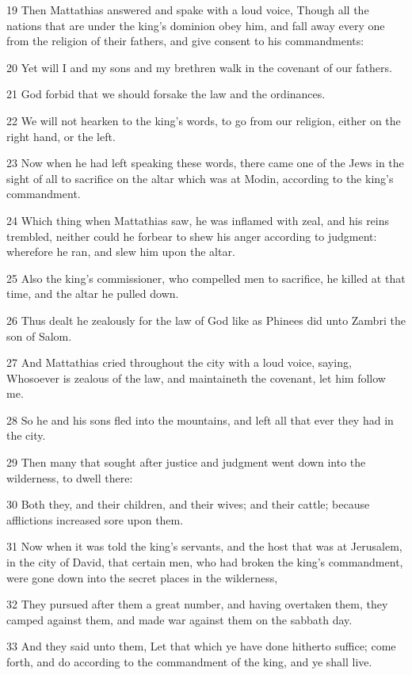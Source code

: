 \par 19 Then Mattathias answered and spake with a loud voice, Though all the nations that are under the king's dominion obey him, and fall away every one from the religion of their fathers, and give consent to his commandments:
\par 20 Yet will I and my sons and my brethren walk in the covenant of our fathers.
\par 21 God forbid that we should forsake the law and the ordinances.
\par 22 We will not hearken to the king's words, to go from our religion, either on the right hand, or the left.
\par 23 Now when he had left speaking these words, there came one of the Jews in the sight of all to sacrifice on the altar which was at Modin, according to the king's commandment.
\par 24 Which thing when Mattathias saw, he was inflamed with zeal, and his reins trembled, neither could he forbear to shew his anger according to judgment: wherefore he ran, and slew him upon the altar.
\par 25 Also the king's commissioner, who compelled men to sacrifice, he killed at that time, and the altar he pulled down.
\par 26 Thus dealt he zealously for the law of God like as Phinees did unto Zambri the son of Salom.
\par 27 And Mattathias cried throughout the city with a loud voice, saying, Whosoever is zealous of the law, and maintaineth the covenant, let him follow me.
\par 28 So he and his sons fled into the mountains, and left all that ever they had in the city.
\par 29 Then many that sought after justice and judgment went down into the wilderness, to dwell there:
\par 30 Both they, and their children, and their wives; and their cattle; because afflictions increased sore upon them.
\par 31 Now when it was told the king's servants, and the host that was at Jerusalem, in the city of David, that certain men, who had broken the king's commandment, were gone down into the secret places in the wilderness,
\par 32 They pursued after them a great number, and having overtaken them, they camped against them, and made war against them on the sabbath day.
\par 33 And they said unto them, Let that which ye have done hitherto suffice; come forth, and do according to the commandment of the king, and ye shall live.
